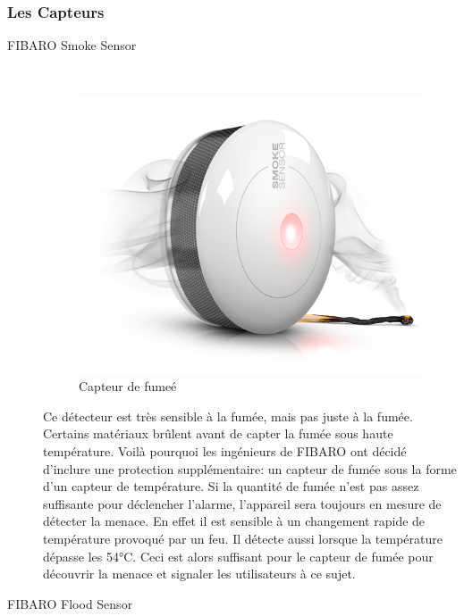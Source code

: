 \subsubsection{Les Capteurs}

\begin{description}
\item[FIBARO Smoke Sensor] \hfill \\

\begin{figure}[h]
	\center
	\includegraphics[scale=0.4]{./Images/png/smoke.png}
	\caption{Capteur de fumeé}
\end{figure}

Ce détecteur est très sensible à la fumée, mais pas juste à la fumée. Certains matériaux brûlent avant de capter la fumée sous haute température.
Voilà pourquoi les ingénieurs de  FIBARO ont décidé d'inclure une protection supplémentaire: un capteur de fumée sous la forme d'un capteur de température.
 Si la quantité de fumée n'est pas assez suffisante pour déclencher l'alarme, l'appareil sera toujours en mesure de détecter la menace.
En effet il est sensible à un changement rapide de température provoqué par un feu. Il détecte aussi lorsque la température dépasse les 54°C. Ceci est alors suffisant pour le capteur de fumée pour découvrir la menace et signaler les utilisateurs à ce sujet. 

\item[FIBARO Flood Sensor] \hfill \\


\end{description}
